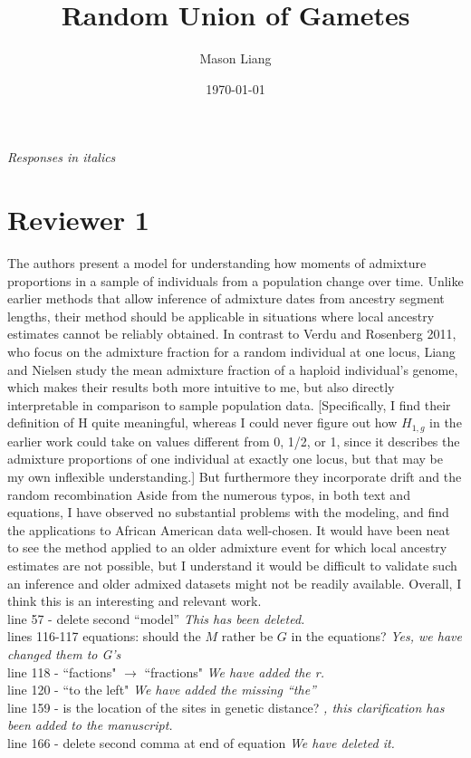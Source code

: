 \documentclass[11pt]{amsart}
\title{Random Union of Gametes}
\author{Mason Liang}
\date{\today}
\begin{document}
\textit{Responses in italics}
\section{Reviewer 1}
The authors present a model for understanding how moments of admixture proportions in a 
sample of individuals from a population change over time. Unlike earlier methods that allow 
inference of admixture dates from ancestry segment lengths, their method should be applicable in 
situations where local ancestry estimates cannot be reliably obtained. 
In contrast to Verdu and Rosenberg 2011, who focus on the admixture fraction for a random 
individual at one locus, Liang and Nielsen study the mean admixture fraction of a haploid 
individual’s genome, which makes their results both more intuitive to me, but also directly 
interpretable in comparison to sample population data. [Specifically, I find their definition of H 
quite meaningful, whereas I could never figure out how $H_{1,g}$ in the earlier work could take on 
values different from 0, 1/2, or 1, since it describes the admixture proportions of one individual at 
exactly one locus, but that may be my own inflexible understanding.]
But furthermore they incorporate drift and the random recombination 
Aside from the numerous typos, in both text and equations, I have observed no substantial 
problems with the modeling, and find the applications to African American data well-chosen. It 
would have been neat to see the method applied to an older admixture event for which local 
ancestry estimates are not possible, but I understand it would be difficult to validate such an 
inference and older admixed datasets might not be readily available. Overall, I think this is an 
interesting and relevant work.\\ 
line 57 - delete second “model” \textit{This has been deleted.}\\
lines 116-117 equations: should the $M$ rather be $G$ in the equations? \textit{Yes, we have changed them to G's}\\
line 118 - ``factions" $\rightarrow$ ``fractions" \textit{We have added the r.}\\
line 120 - ``to the left" \textit{We have added the missing ``the''}\\
line 159 - is the location of the sites in genetic distance? \textit{, this clarification has been added to the manuscript.}\\
line 166 - delete second comma at end of equation \textit{We have deleted it.}\\
\end{document}
